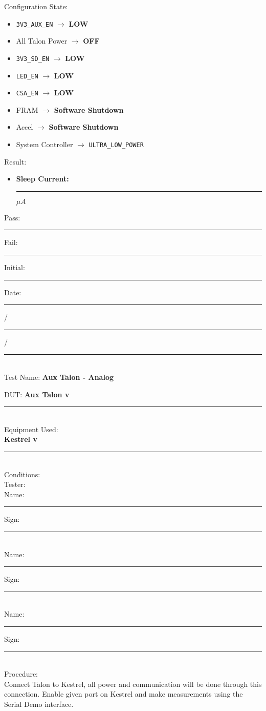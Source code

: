 {\large Configuration State:}\\
\begin{itemize}
\item \texttt{3V3\_AUX\_EN} $\rightarrow$ \textbf{LOW}
\item All Talon Power $\rightarrow$ \textbf{OFF}
\item \texttt{3V3\_SD\_EN} $\rightarrow$ \textbf{LOW}
\item \texttt{LED\_EN} $\rightarrow$ \textbf{LOW}
\item \texttt{CSA\_EN} $\rightarrow$ \textbf{LOW}
\item FRAM $\rightarrow$ \textbf{Software Shutdown}
\item Accel $\rightarrow$ \textbf{Software Shutdown}
\item System Controller $\rightarrow$ \texttt{ULTRA\_LOW\_POWER}
\end{itemize}

{\Large Result:}\\

\begin{itemize}
\item \textbf{Sleep Current:} \rule{3cm}{0.15mm} $\mu A$
\end{itemize}

\vfill
{\large Pass: \rule{1cm}{0.15mm} \hspace{1cm} Fail: \rule{1cm}{0.15mm}} \hfill Initial: \rule{2cm}{0.15mm} \hspace{1cm} Date: \rule{0.5cm}{0.15mm}/\rule{0.5cm}{0.15mm}/\rule{1cm}{0.15mm}\\[5pt]

\pagebreak
{\Huge Test Name: \textbf{Aux Talon - Analog}}\\[20pt]
{\Large DUT: \textbf{Aux Talon v}\rule{1cm}{0.15mm}} \\[10pt]
{\Large Equipment Used: }\\[5pt]
\textbf{Kestrel v}\rule{1cm}{0.15mm} \\[40pt]
{\Large Conditions: }\\[40pt]
{\Large Tester: }\\[10pt]
Name: \rule{4cm}{0.15mm} \hfill Sign: \rule{4cm}{0.15mm}\\[5pt]
Name: \rule{4cm}{0.15mm} \hfill Sign: \rule{4cm}{0.15mm}\\[5pt]
Name: \rule{4cm}{0.15mm} \hfill Sign: \rule{4cm}{0.15mm}\\[15pt]
{\Large Procedure: }\\
Connect Talon to Kestrel, all power and communication will be done through this connection. Enable given port on Kestrel and make measurements using the Serial Demo interface. 

